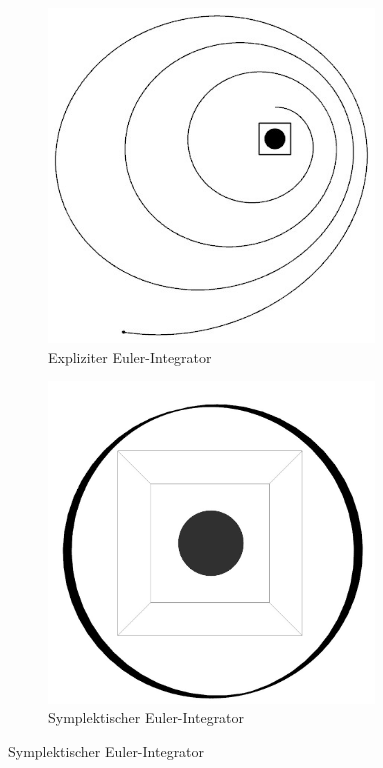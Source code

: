     \begin{figure}[p]
      \begin{subfigure}[b]{0.49\textwidth}
        \center
        \includegraphics[width=0.95\textwidth]{pictures/sun_earth/euler_0_02.jpg}
        \caption{Expliziter Euler-Integrator}
      \end{subfigure}
      \begin{subfigure}[b]{0.49\textwidth}
        \center
        \includegraphics[width=0.95\textwidth]{pictures/sun_earth/seuler_0_02.jpg}
        \caption{Symplektischer Euler-Integrator}
      \end{subfigure}


\end{figure}

